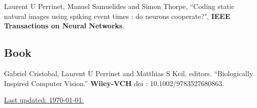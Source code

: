 \documentclass[11pt, a4paper]{article}
\newcommand{\doi}[1]{\href{#1}{\scriptsize\textsc{[doi]}}}
\newcommand{\years}[1]{\marginnote{\scriptsize #1}}
\providecommand{\doi}[1]{doi: #1}\else
\providecommand{\doi}{doi: \begingroup \urlstyle{rm}\Url}\fi
\begin{document}
\noindent\years{2004}Laurent U Perrinet, Manuel Samuelides and Simon Thorpe, ``Coding static natural images using spiking event times : do neurons cooperate?",  {\bf IEEE Transactions on Neural Networks}.\\%

\subsection*{Book}

\noindent\years{2015}Gabriel Cristobal, Laurent U Perrinet and Matthias S Keil, editors. ``Biologically Inspired Computer Vision.'' {\bf Wiley-VCH} %
doi : 10.1002/9783527680863. %
%
%

\vfill{}
\hrulefill

\begin{center}

{\footnotesize \href{https://github.com/laurentperrinet/perrinet_curriculum-vitae.tex}{Last updated: \today .}
}
\end{center}
\end{document}
